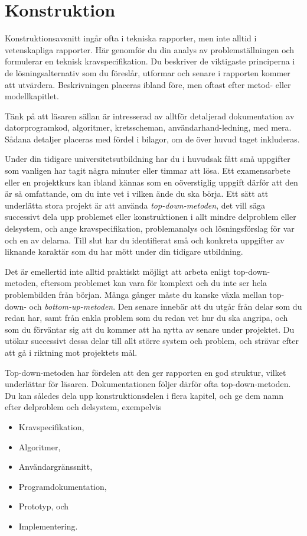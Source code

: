 \chapter{Konstruktion}
\label{ch:implementation}
\noindent
Konstruktionsavsnitt ingår ofta i tekniska rapporter, men inte alltid 
i vetenskapliga rapporter.
Här genomför du din analys av problemställningen och formulerar en teknisk 
kravspecifikation.
Du beskriver de viktigaste principerna i de lösningsalternativ som du föreslår, 
utformar och senare i rapporten kommer att utvärdera.
Beskrivningen placeras ibland före, men oftast efter metod- eller 
modellkapitlet.

Tänk på att läsaren sällan är intresserad av alltför detaljerad dokumentation 
av datorprogramkod, algoritmer, kretsscheman, användarhand-ledning, med mera.
Sådana detaljer placeras med fördel i bilagor, om de över huvud taget 
inkluderas.

Under din tidigare universitetsutbildning har du i huvudsak fått små uppgifter 
som vanligen har tagit några minuter eller timmar att lösa.
Ett examensarbete eller en projektkurs kan ibland kännas som en oöverstiglig 
uppgift därför att den är så omfattande, om du inte vet i vilken ände du ska 
börja.
Ett sätt att underlätta stora projekt är att använda \emph{top-down-metoden},
det vill säga successivt dela upp problemet eller konstruktionen i allt mindre 
delproblem eller delsystem, och ange kravspecifikation, problemanalys och 
lösningsförslag för var och en av delarna.
Till slut har du identifierat små och konkreta uppgifter av liknande karaktär 
som du har mött under din tidigare utbildning.

Det är emellertid inte alltid praktiskt möjligt att arbeta enligt 
top-down-metoden, eftersom problemet kan vara för komplext och du inte ser hela 
problembilden från början.
Många gånger måste du kanske växla mellan top-down- och 
\emph{bottom-up-metoden}.
Den senare innebär att du utgår från delar som du redan har, samt från enkla 
problem som du redan vet hur du ska angripa, och som du förväntar sig att du 
kommer att ha nytta av senare under projektet.
Du utökar successivt dessa delar till allt större system och problem, och 
strävar efter att gå i riktning mot projektets mål.

Top-down-metoden har fördelen att den ger rapporten en god struktur, vilket 
underlättar för läsaren.
Dokumentationen följer därför ofta top-down-metoden.
Du kan således dela upp konstruktionsdelen i flera kapitel, och ge dem namn 
efter delproblem och delsystem, exempelvis
\begin{itemize}
	\item Kravspecifikation,
	\item Algoritmer,
	\item Användargränssnitt,
	\item Programdokumentation,
	\item Prototyp, och
	\item Implementering.
\end{itemize}
